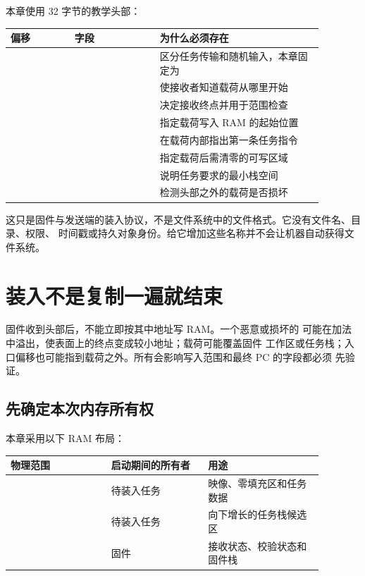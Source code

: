 本章使用 32 字节的教学头部：

\begin{longtable}{|L{0.18\linewidth}|L{0.24\linewidth}|L{0.46\linewidth}|}
\hline
{}
偏移 & 字段 & 为什么必须存在 \\ \hline
{} &  & 区分任务传输和随机输入，本章固定为  \\ \hline
{} &  & 使接收者知道载荷从哪里开始 \\ \hline
{} &  & 决定接收终点并用于范围检查 \\ \hline
{} &  & 指定载荷写入 RAM 的起始位置 \\ \hline
{} &  & 在载荷内部指出第一条任务指令 \\ \hline
{} &  & 指定载荷后需清零的可写区域 \\ \hline
{} &  & 说明任务要求的最小栈空间 \\ \hline
{} &  & 检测头部之外的载荷是否损坏 \\ \hline
\end{longtable}

这只是固件与发送端的装入协议，不是文件系统中的文件格式。它没有文件名、目录、权限、
时间戳或持久对象身份。给它增加这些名称并不会让机器自动获得文件系统。

\section{装入不是复制一遍就结束}

固件收到头部后，不能立即按其中地址写 RAM。一个恶意或损坏的
 可能在加法中溢出，使表面上的终点变成较小地址；载荷可能覆盖固件
工作区或任务栈；入口偏移也可能指到载荷之外。所有会影响写入范围和最终 PC 的字段都必须
先验证。

\subsection{先确定本次内存所有权}

本章采用以下 RAM 布局：

\begin{longtable}{|L{0.29\linewidth}|L{0.27\linewidth}|L{0.32\linewidth}|}
\hline
{}
物理范围 & 启动期间的所有者 & 用途 \\ \hline
{} & 待装入任务 & 映像、零填充区和任务数据 \\ \hline
{} & 待装入任务 & 向下增长的任务栈候选区 \\ \hline
{} & 固件 & 接收状态、校验状态和固件栈 \\ \hline
\end{longtable}

